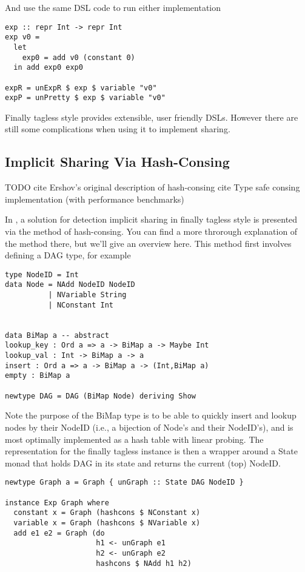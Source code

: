 \documentclass[runningheads]{llncs}
\begin{document}
And use the same DSL code to run either implementation
\begin{verbatim}
exp :: repr Int -> repr Int
exp v0 =
  let
    exp0 = add v0 (constant 0)
  in add exp0 exp0

expR = unExpR $ exp $ variable "v0"
expP = unPretty $ exp $ variable "v0"
\end{verbatim}

Finally tagless style provides extensible, user friendly DSLs. However there
are still some complications when using it to implement sharing.

\subsection{Implicit Sharing Via Hash-Consing}
TODO
cite Ershov’s original description of hash-consing \cite{ershov1958:consing}
cite Type safe consing implementation (with performance benchmarks) \cite{filliatre:typesafeconsing}

In \cite{kiselyov:sharing}, a solution for detection implicit sharing in finally
tagless style is presented via the method of hash-consing. You can find a more
throrough explanation of the method there, but we'll give an overview here. This
method first involves defining a DAG type, for example
\begin{verbatim}
type NodeID = Int
data Node = NAdd NodeID NodeID
          | NVariable String
          | NConstant Int


data BiMap a -- abstract
lookup_key : Ord a => a -> BiMap a -> Maybe Int
lookup_val : Int -> BiMap a -> a
insert : Ord a => a -> BiMap a -> (Int,BiMap a)
empty : BiMap a

newtype DAG = DAG (BiMap Node) deriving Show
\end{verbatim}

Note the purpose of the BiMap type is to be able to quickly insert and lookup
nodes by their NodeID (i.e., a bijection of Node's and their NodeID's), and is
most optimally implemented as a hash table with linear probing. The
representation for the finally tagless instance is then a wrapper around a State
monad that holds DAG in its state and returns the current (top) NodeID.

\begin{verbatim}
newtype Graph a = Graph { unGraph :: State DAG NodeID }

instance Exp Graph where
  constant x = Graph (hashcons $ NConstant x)
  variable x = Graph (hashcons $ NVariable x)
  add e1 e2 = Graph (do
                     h1 <- unGraph e1
                     h2 <- unGraph e2
                     hashcons $ NAdd h1 h2)
\end{verbatim}
\end{document}
